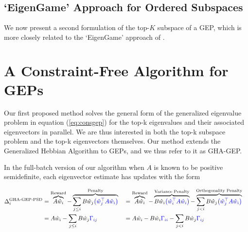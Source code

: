 \subsection{`EigenGame' Approach for Ordered Subspaces}\label{sec:gep-eg-formulation}

We now present a second formulation of the top-$K$ subspace of a GEP, which is more closely related to the `EigenGame' approach of \cite{gemp20,gemp2021}.

\section{A Constraint-Free Algorithm for GEPs}

Our first proposed method solves the general form of the generalized eigenvalue problem in equation (\ref{eq:consgep}) for the top-k eigenvalues and their associated eigenvectors in parallel. We are thus interested in both the top-k subspace problem and the top-k eigenvectors themselves. Our method extends the Generalized Hebbian Algorithm to GEPs, and we thus refer to it as GHA-GEP.

In the full-batch version of our algorithm when $A$ is known to be positive semidefinite, each eigenvector estimate has updates with the form

\begin{align}
\Delta_{i}^{\text{GHA-GEP-PSD}}
&=
\overbrace{A \hat{w}_{i}}^{\text{Reward}} - \overbrace{\sum_{j \leq i}B\hat{w}_{j}\textcolor{blue}{\left(\hat{w}_{j}^{\top} A \hat{w}_{i}\right)}}^{\text{Penalty}}
&&=
\overbrace{A \hat{w}_{i}}^{\text{Reward}} - \overbrace{B\hat{w}_{i}\textcolor{blue}{\left(\hat{w}_{i}^{\top} A \hat{w}_{i}\right)}}^{\text{Variance Penalty}} - \overbrace{\sum_{j < i}B\hat{w}_{j}\textcolor{blue}{\left(\hat{w}_{j}^{\top} A \hat{w}_{i}\right)}}^{\text{Orthogonality Penalty}} & \nonumber\\
&=A \hat{w}_{i} - \sum_{j \leq i}B\hat{w}_{j}\textcolor{blue}{\Gamma_{ij}}
&&=
A \hat{w}_{i} - B\hat{w}_{i}\textcolor{blue}{\Gamma_{ii}} - \sum_{j < i}B\hat{w}_{j}\textcolor{blue}{\Gamma_{ij}}&
\label{eq:psdupdate}
\end{align}

